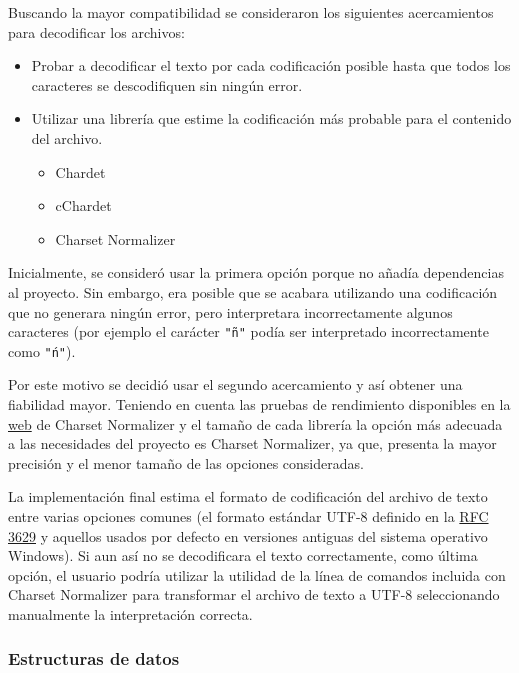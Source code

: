 Buscando la mayor compatibilidad se consideraron los siguientes acercamientos para decodificar los archivos:

\begin{itemize}
	\item{Probar a decodificar el texto por cada codificación posible hasta que todos los caracteres se descodifiquen sin ningún error.}
	\item{Utilizar una librería que estime la codificación más probable para el contenido del archivo.}
	\begin{itemize}
		\item{Chardet}
		\item{cChardet}
		\item{Charset Normalizer}
	\end{itemize}
\end{itemize}

Inicialmente, se consideró usar la primera opción porque no añadía dependencias al proyecto. Sin embargo, era posible que se acabara utilizando una codificación que no generara ningún error, pero interpretara incorrectamente algunos caracteres (por ejemplo el carácter \texttt{"ñ"} podía ser interpretado incorrectamente como \texttt{"ń"}).

Por este motivo se decidió usar el segundo acercamiento y así obtener una fiabilidad mayor. Teniendo en cuenta las pruebas de rendimiento disponibles en la \href{https://github.com/Ousret/charset_normalizer}{web} de Charset Normalizer y el tamaño de cada librería la opción más adecuada a las necesidades del proyecto es Charset Normalizer, ya que, presenta la mayor precisión y el menor tamaño de las opciones consideradas.

La implementación final estima el formato de codificación del archivo de texto entre varias opciones comunes (el formato estándar UTF-8 definido en la \href{https://www.rfc-editor.org/rfc/rfc3629}{RFC 3629} y aquellos usados por defecto en versiones antiguas del sistema operativo Windows). Si aun así no se decodificara el texto correctamente, como última opción, el usuario podría utilizar la utilidad de la línea de comandos incluida con Charset Normalizer para transformar el archivo de texto a UTF-8 seleccionando manualmente la interpretación correcta.

\subsubsection{Estructuras de datos}

